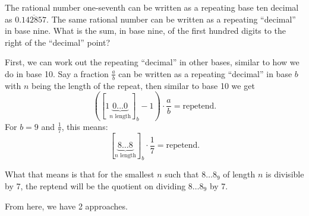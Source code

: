 \documentclass[11pt,twoside]{scrartcl}
\begin{document}
\begin{problem}
    The rational number one-seventh can be written as a repeating base ten decimal as $ 0.\overline{142857} $. The same rational number can be written as a repeating ``decimal'' in base nine. What is the sum, in base nine, of the first hundred digits to the right of the ``decimal'' point?
    \begin{sketch}
        First, we can work out the repeating ``decimal'' in other bases, similar to how we do in base 10. Say a fraction $\frac{a}{b}$ can be written as a repeating ``decimal'' in base $b$ with $n$ being the length of the repeat, then similar to base 10 we get
        \[ ([1\underbrace{0\ldots0}_{n \text{ length}}]_b -1) \cdot \frac{a}{b} = \text{repetend}.\]
        For $b=9$ and $\frac{1}{7}$, this means:
        \[ [\underbrace{8\ldots8}_{n \text{ length}}]_b \cdot \frac{1}{7} = \text{repetend}.\]

        What that means is that for the smallest $n$ such that $8\ldots8_9$ of length $n$ is divisible by 7, the reptend will be the quotient on dividing $8\ldots8_9$ by 7.
        
        From here, we have 2 approaches.


\end{sketch}
\end{problem}
\end{document}
